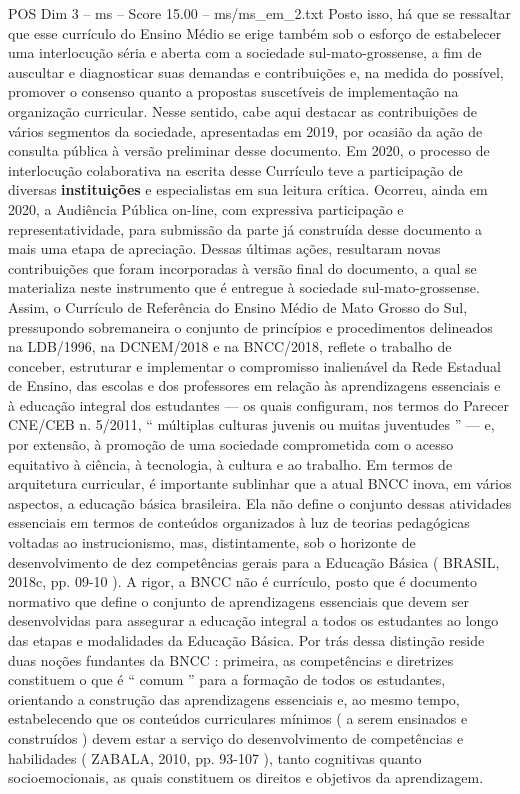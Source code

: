 \begin{textsample}{POS Dim 3 – ms – Score 15.00 – ms/ms\_em\_2.txt}
Posto isso, há que se ressaltar que esse currículo do Ensino Médio se erige também sob o esforço de estabelecer uma interlocução séria e aberta com a sociedade sul-mato-grossense, a fim de auscultar e diagnosticar suas demandas e contribuições e, na medida do possível, promover o consenso quanto a propostas suscetíveis de implementação na organização curricular.
Nesse sentido, cabe aqui destacar as contribuições de vários segmentos da sociedade, apresentadas em 2019, por ocasião da ação de consulta pública à versão preliminar desse documento.
Em 2020, o processo de interlocução colaborativa na escrita desse Currículo teve a participação de diversas \textbf{instituições} e especialistas em sua leitura crítica.
Ocorreu, ainda em 2020, a Audiência Pública on-line, com expressiva participação e representatividade, para submissão da parte já construída desse documento a mais uma etapa de apreciação.
Dessas últimas ações, resultaram novas contribuições que foram incorporadas à versão final do documento, a qual se materializa neste instrumento que é entregue à sociedade sul-mato-grossense.
Assim, o Currículo de Referência do Ensino Médio de Mato Grosso do Sul, pressupondo sobremaneira o conjunto de princípios e procedimentos delineados na LDB/1996, na DCNEM/2018 e na BNCC/2018, reflete o trabalho de conceber, estruturar e implementar o compromisso inalienável da Rede Estadual de Ensino, das escolas e dos professores em relação às aprendizagens essenciais e à educação integral dos estudantes — os quais configuram, nos termos do Parecer CNE/CEB n. 5/2011, “ múltiplas culturas juvenis ou muitas juventudes ” — e, por extensão, à promoção de uma sociedade comprometida com o acesso equitativo à ciência, à tecnologia, à cultura e ao trabalho.
Em termos de arquitetura curricular, é importante sublinhar que a atual BNCC inova, em vários aspectos, a educação básica brasileira.
Ela não define o conjunto dessas atividades essenciais em termos de conteúdos organizados à luz de teorias pedagógicas voltadas ao instrucionismo, mas, distintamente, sob o horizonte de desenvolvimento de dez competências gerais para a Educação Básica ( BRASIL, 2018c, pp. 09-10 ).
A rigor, a BNCC não é currículo, posto que é documento normativo que define o conjunto de aprendizagens essenciais que devem ser desenvolvidas para assegurar a educação integral a todos os estudantes ao longo das etapas e modalidades da Educação Básica.
Por trás dessa distinção reside duas noções fundantes da BNCC : primeira, as competências e diretrizes constituem o que é “ comum ” para a formação de todos os estudantes, orientando a construção das aprendizagens essenciais e, ao mesmo tempo, estabelecendo que os conteúdos curriculares mínimos ( a serem ensinados e construídos ) devem estar a serviço do desenvolvimento de competências e habilidades ( ZABALA, 2010, pp. 93-107 ), tanto cognitivas quanto socioemocionais, as quais constituem os direitos e objetivos da aprendizagem.

\end{textsample}
